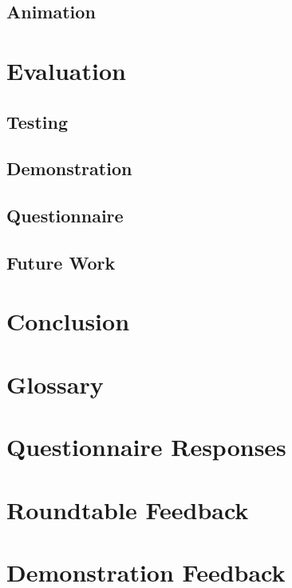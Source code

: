 \documentclass{l3proj}
\begin{document}
\section{Animation}
\label{impl:anim}


\chapter{Evaluation}
\label{eval}

\section{Testing}
\label{eval:testing}


\section{Demonstration}
\label{eval:demo}


\section{Questionnaire}
\label{eval:question}


\section{Future Work}
\label{eval:future}



\chapter{Conclusion}
\label{conc}



\appendix

\chapter{Glossary}



\chapter{Questionnaire Responses}
\label{app:questionnaireResponses}


\chapter{Roundtable Feedback}
\label{app:roundtableFeedback}


\chapter{Demonstration Feedback}
\label{app:demonstrationFeedback}


\clearpage


\end{document}
